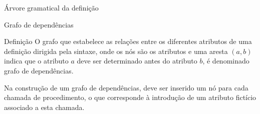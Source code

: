 \begin{frame}[fragile]{Árvore gramatical da definição }

    \begin{figure}
        \centering

    \end{figure}

\end{frame}

\begin{frame}[fragile]{Grafo de dependências}

    \begin{block}{Definição}
        O grafo que estabelece as relações entre os diferentes atributos de uma definição dirigida pela sintaxe, onde os nós são
        os atributos e uma aresta $(a, b)$ indica que o atributo $a$ deve ser determinado antes do atributo $b$, é denominado
        grafo de dependências.
    \end{block}

    \vspace{0.2in}

    Na construção de um grafo de dependências, deve ser inserido um nó para cada chamada de procedimento, o que corresponde à
        introdução de um atributo fictício associado a esta chamada.

\end{frame}

